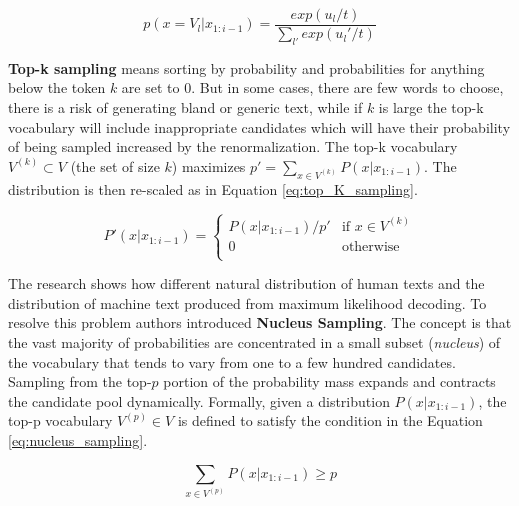 \begin{equation} \label{eq:temperature_sampling}
p(x=V_l|x_{1:i-1}) = \frac{exp(u_l / t)}{\sum_{l'} exp(u_l' / t)}
\end{equation}

\textbf{Top-k sampling} means sorting by probability and probabilities for anything below the token $k$ are set to 0. But in some cases, there are few words to choose, there is a risk of generating bland or generic text, while if $k$ is large the top-k vocabulary will include inappropriate candidates which will have their probability of being sampled increased by the renormalization. The top-k vocabulary $V^{(k)} \subset V$ (the set of size $k$) maximizes $p' = \sum_{x \in V^{(k)}} P(x|x_{1:i-1})$. The distribution is then re-scaled as in Equation \ref{eq:top_K_sampling}.

\begin{equation} \label{eq:top_K_sampling}
P'(x|x_{1:i-1}) = \begin{cases} 
          P(x|x_{1:i-1}) / p' & \mbox{if $x \in V^{(k)}$} \\
          0 & \mbox{otherwise}\\
         \end{cases}
\end{equation}

The research shows how different natural distribution of human texts and the distribution of machine text produced from maximum likelihood decoding. To resolve this problem authors introduced \textbf{Nucleus Sampling}. The concept is that the vast majority of probabilities are concentrated in a small subset (\textit{nucleus}) of the vocabulary that tends to vary from one to a few hundred candidates. Sampling from the top-$p$ portion of the probability mass expands and contracts the candidate pool dynamically. Formally, given a distribution $P(x|x_{1:i-1})$, the top-p vocabulary $V^{(p)} \in V$ is defined to satisfy the condition in the Equation \ref{eq:nucleus_sampling}.

\begin{equation} \label{eq:nucleus_sampling}
\sum_{x \in V^{(p)}} P(x|x_{1:i-1})  \geqslant p
\end{equation}

